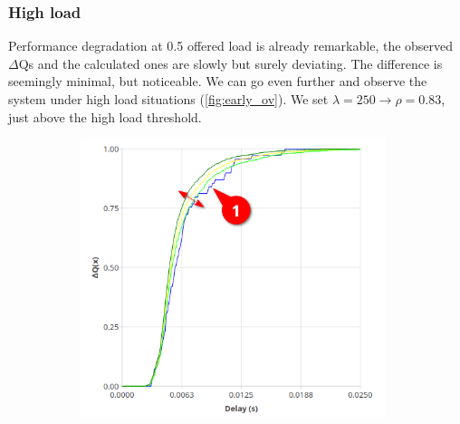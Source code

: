 \subsubsection{High load}
    Performance degradation at 0.5 offered load is already remarkable, the observed $\Delta$Qs and the calculated ones are slowly but surely deviating. The difference is seemingly minimal, but noticeable. We can go even further and observe the system under high load situations (\cref{fig:early_ov}). We set $\lambda = 250 \rightarrow \rho = 0.83$, just above the high load threshold.
    
       \begin{figure}[H]
            \centering
            \begin{subfigure}{.5\textwidth}
                \centering
                \includegraphics[width=0.98\textwidth]{img/overload_2/250_workera.png}
                \label{fig:high_load_1}
            \end{subfigure}%
            \begin{subfigure}{.5\textwidth}
                \centering

\end{subfigure}
\end{figure}
